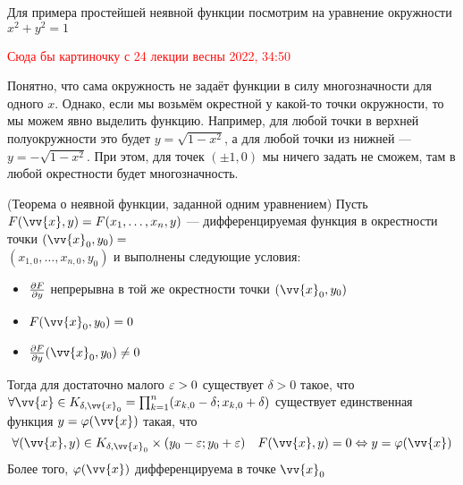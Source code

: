 \begin{example}
	Для примера простейшей неявной функции посмотрим на уравнение окружности $x^2 + y^2 = 1$
	
	\textcolor{red}{Сюда бы картиночку с 24 лекции весны 2022, 34:50}
	
	Понятно, что сама окружность не задаёт функции в силу многозначности для одного $x$. Однако, если мы возьмём окрестной у какой-то точки окружности, то мы можем явно выделить функцию. Например, для любой точки в верхней полуокружности это будет $y = \sqrt{1 - x^2}$, а для любой точки из нижней --- $y = -\sqrt{1 - x^2}$. При этом, для точек $(\pm 1, 0)$ мы ничего задать не сможем, там в любой окрестности будет многозначность.
\end{example}

\begin{theorem} (Теорема о неявной функции, заданной одним уравнением)
	Пусть $F(\vv{x}, y) = F(x_1, \ldots, x_n, y)$ --- дифференцируемая функция в окрестности точки $(\vv{x}_0, y_0) =$ \\ $(x_{1, 0}, \ldots, x_{n, 0}, y_0)$ и выполнены следующие условия:
	\begin{itemize}
		\item $\frac{\partial F}{\partial y}$ непрерывна в той же окрестности точки $(\vv{x}_0, y_0)$
		
		\item $F(\vv{x}_0, y_0) = 0$
		
		\item $\pd{F}{y}(\vv{x}_0, y_0) \neq 0$
	\end{itemize}
	Тогда для достаточно малого $\varepsilon > 0$ существует $\delta > 0$ такое, что $\forall \vv{x} \in K_{\delta, \vv{x}_0} = \prod_{k = 1}^n (x_{k, 0} - \delta; x_{k, 0} + \delta)$ существует единственная функция $y = \phi(\vv{x})$ такая, что
	\[
		\forall (\vv{x}, y) \in K_{\delta, \vv{x}_0} \times (y_0 - \eps; y_0 + \eps) \quad F(\vv{x}, y) = 0 \lra y = \phi(\vv{x})
	\]
	Более того, $\phi(\vv{x})$ дифференцируема в точке $\vv{x}_0$
\end{theorem}

